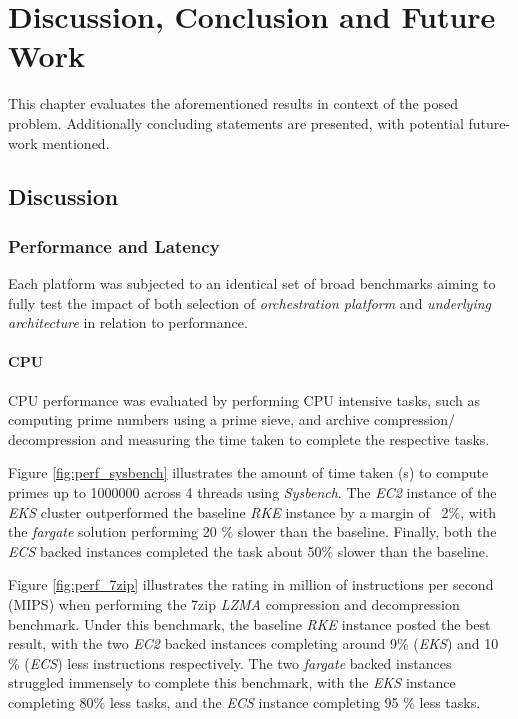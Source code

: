 \part{Discussion, Conclusion and Future Work}

This chapter evaluates the aforementioned results in context of the posed problem.
Additionally concluding statements are presented, with potential future-work mentioned.

\chapter{Discussion}

\section{Performance and Latency}
Each platform was subjected to an identical set of broad benchmarks aiming to fully test the impact of both
selection of \emph{orchestration platform} and \emph{underlying architecture} in relation to performance.

\subsection{CPU}
CPU performance was evaluated by performing CPU intensive tasks, such as computing prime numbers using a prime sieve,
and archive compression/ decompression and measuring the time taken to complete the respective tasks.

Figure \ref{fig:perf_sysbench} illustrates the amount of time taken (s) to compute primes up to 1000000 across 4 threads using \textit{Sysbench}.
The \textit{EC2} instance of the \textit{EKS} cluster outperformed the baseline \textit{RKE} instance by a margin of ~2\%,
with the \textit{fargate} solution performing 20 \% slower than the baseline.
Finally, both the \textit{ECS} backed instances completed the task about 50\% slower than the baseline.

Figure \ref{fig:perf_7zip} illustrates the rating in million of instructions per second (MIPS) when performing the 7zip \textit{LZMA} compression and decompression benchmark.
Under this benchmark, the baseline \textit{RKE} instance posted the best result, with the two \textit{EC2} backed instances completing around 9\% (\textit{EKS}) and 10 \% (\textit{ECS}) less instructions respectively.
The two \textit{fargate} backed instances struggled immensely to complete this benchmark,
with the \textit{EKS} instance completing 80\% less tasks, and the \textit{ECS} instance completing 95 \% less tasks.

